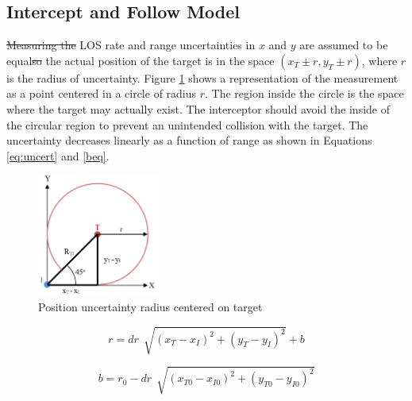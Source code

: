 \documentclass[conference]{IEEEtran}
\providecommand{\DIFadd}[1]{{\protect\color{blue}\uwave{#1}}} %
\providecommand{\DIFdel}[1]{{\protect\color{red}\sout{#1}}}                      %
\providecommand{\DIFaddbegin}{} %
\providecommand{\DIFaddend}{} %
\providecommand{\DIFdelbegin}{} %
\providecommand{\DIFdelend}{} %
\newcommand{\DIFscaledelfig}{0.5}
\newlength{\DIFdelgraphicswidth} %
\newlength{\DIFdelgraphicsheight} %
\newcommand{\DIFaddincludegraphics}[2][]{{\color{blue}\fbox{\DIFOincludegraphics[#1]{#2}}}} %
\newcommand{\DIFdelincludegraphics}[2][]{%
\sbox{\DIFdelgraphicsbox}{\DIFOincludegraphics[#1]{#2}}%
\settoboxwidth{\DIFdelgraphicswidth}{\DIFdelgraphicsbox} %
\settoboxtotalheight{\DIFdelgraphicsheight}{\DIFdelgraphicsbox} %
\scalebox{\DIFscaledelfig}{%
\parbox[b]{\DIFdelgraphicswidth}{\usebox{\DIFdelgraphicsbox}\\[-\baselineskip] \rule{\DIFdelgraphicswidth}{0em}}\llap{\resizebox{\DIFdelgraphicswidth}{\DIFdelgraphicsheight}{%
\setlength{\unitlength}{\DIFdelgraphicswidth}%
\begin{picture}(1,1)%
\thicklines\linethickness{2pt} %
{\color[rgb]{1,0,0}\put(0,0){\framebox(1,1){}}}%
{\color[rgb]{1,0,0}\put(0,0){\line( 1,1){1}}}%
{\color[rgb]{1,0,0}\put(0,1){\line(1,-1){1}}}%
\end{picture}%
}\hspace*{3pt}}} %
} %
\DeclareRobustCommand{\DIFaddbegin}{\DIFOaddbegin \let\includegraphics\DIFaddincludegraphics} %
\DeclareRobustCommand{\DIFaddend}{\DIFOaddend \let\includegraphics\DIFOincludegraphics} %
\DeclareRobustCommand{\DIFdelbegin}{\DIFOdelbegin \let\includegraphics\DIFdelincludegraphics} %
\DeclareRobustCommand{\DIFdelend}{\DIFOaddend \let\includegraphics\DIFOincludegraphics} %
\begin{document}
\DIFdelend \subsection{Intercept and Follow Model}
\DIFdelbegin \DIFdel{Measuring the }\DIFdelend \DIFaddbegin \DIFadd{The }\DIFaddend LOS rate and range uncertainties in $x$ and $y$ are assumed to be equal\DIFdelbegin \DIFdel{so }\DIFdelend \DIFaddbegin \DIFadd{, therefore }\DIFaddend the actual position of the target is in the space $(x_T\pm r,y_T \pm r)$, where $r$ is the radius of uncertainty. Figure \ref{fig:uncertrad} shows a representation of the measurement as a point centered in a circle of radius $r$. The region inside the circle is the space where the target may actually exist. The interceptor should avoid the inside of the circular region to prevent an unintended collision with the target. The uncertainty decreases linearly as a function of range as shown in Equations \ref{eq:uncert} and \ref{beq}.

\begin{figure}[H]
	\centering
	\includegraphics[width=4cm]{45deguncert.PNG}
	\caption{Position uncertainty radius centered on target}
	\label{fig:uncertrad}
\end{figure}




\DIFdelbegin %

\DIFdelend \begin{equation} \label{eq:uncert}
r = dr \,\sqrt[]{(x_T - x_I)^2+(y_T - y_I)^2}+b
\end{equation}




\DIFdelbegin %

\DIFdelend \begin{equation} \label{beq}
b = r_0-dr \,\sqrt[]{(x_{T0} - x_{I0})^2+(y_{T0} - y_{I0})^2}
\end{equation}
\end{document}
